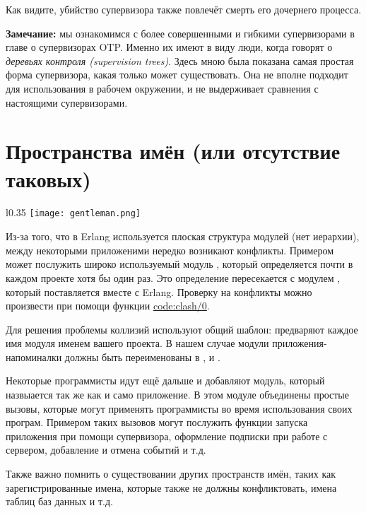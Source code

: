 Как видите, убийство супервизора также повлечёт смерть его дочернего процесса.

\colorbox{lgray}
{
\begin{minipage}{1.0\linewidth}
    \textbf{Замечание:} мы ознакомимся с более совершенными и гибкими супервизорами в главе о супервизорах OTP.
    Именно их имеют в виду люди, когда говорят о \emph{деревьях контроля (supervision trees)}.
    Здесь мною была показана самая простая форма супервизора, какая только может существовать.
    Она не вполне подходит для использования в рабочем окружении, и не выдерживает сравнения с настоящими супервизорами.

\end{minipage}
}
\section{Пространства имён (или отсутствие таковых)}
\label{namespaces-or-lack-thereof}
\begin{wrapfigure}{l}{0.35\linewidth}
    \texttt{[image: gentleman.png]}
\end{wrapfigure}
Из\--за того, что в Erlang используется плоская структура модулей (нет иерархии), между некоторыми приложеними нередко возникают конфликты.
Примером может послужить широко используемый модуль , который определяется почти в каждом проекте хотя бы один раз.
Это определение пересекается с модулем , который поставляется вместе с Erlang.
Проверку на конфликты можно произвести при помощи функции \href{http://erldocs.com/17.3/kernel/code.html#clash/0}{code:clash/0}.

Для решения проблемы коллизий используют общий шаблон: предваряют каждое имя модуля именем вашего проекта.
В нашем случае модули приложения\--напоминалки должны быть переименованы в ,  и .

Некоторые программисты идут ещё дальше и добавляют модуль, который назвыается так же как и само приложение.
В этом модуле объединены простые вызовы, которые могут применять программисты во время использования своих програм.
Примером таких вызовов могут послужить функции запуска приложения при помощи супервизора, оформление подписки при работе с сервером, добавление и отмена событий и т.д.

Также важно помнить о существовании других пространств имён, таких как зарегистрированные имена, которые также не должны конфликтовать, имена таблиц баз данных и т.д.

